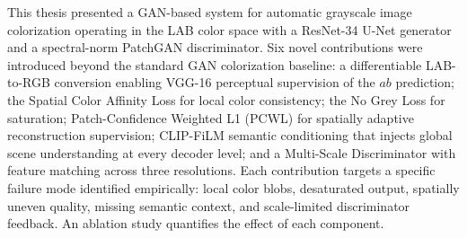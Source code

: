 \documentclass[12pt, a4paper, oneside]{report}
\begin{document}
This thesis presented a GAN-based system for automatic grayscale image colorization
operating in the LAB color space with a ResNet-34 U-Net generator and a spectral-norm
PatchGAN discriminator. Six novel contributions were introduced beyond the standard
GAN colorization baseline: a differentiable LAB-to-RGB conversion enabling VGG-16
perceptual supervision of the $ab$ prediction; the Spatial Color Affinity Loss for
local color consistency; the No Grey Loss for saturation; Patch-Confidence Weighted
L1 (PCWL) for spatially adaptive reconstruction supervision; CLIP-FiLM semantic
conditioning that injects global scene understanding at every decoder level; and a
Multi-Scale Discriminator with feature matching across three resolutions. Each
contribution targets a specific failure mode identified empirically: local color
blobs, desaturated output, spatially uneven quality, missing semantic context, and
scale-limited discriminator feedback. An ablation study quantifies the effect of
each component. %


\printbibliography[heading=bibintoc, title={References}]
\end{document}
